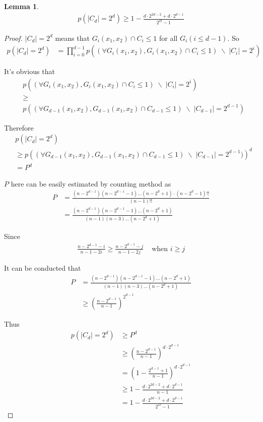 \documentclass[10pt,a4paper]{article}
\newtheorem{mylemma}{Lemma}
\begin{document}
		\begin{mylemma}
			\begin{align*}
				p(|C_d| = 2^d) \geq 1-\frac{d \cdot 2^{2d-2}+d \cdot 2^{d-1}}{2^D-1}
			\end{align*}
		\end{mylemma}
		
		\begin{proof}
			$|C_d| = 2^d$ means that $G_i(x_1, x_2) \cap C_i \leq 1$
			for all $G_i(i \leq d-1)$. So
			\begin{align*}
				p(|C_d| = 2^d) &= \prod_{i=0}^{d-1} p\left((\forall G_i(x_1, x_2), G_i(x_1, x_2) \cap C_i \leq 1)
					 \; \backslash \; |C_i| = 2^i\right)
			\end{align*}
			
			It's obvious that
			\begin{align*}
			&p\left((\forall G_i(x_1, x_2), G_i(x_1, x_2) \cap C_i \leq 1) \; \backslash \; |C_i| = 2^i\right)\\
			&\geq \\
			&p\left((\forall G_{d-1}(x_1, x_2), G_{d-1}(x_1, x_2) \cap C_{d-1} \leq 1) \; \backslash \; 
				|C_{d-1}| = 2^{d-1}\right)
			\end{align*}
			
			Therefore
			\begin{align*}
				&p(|C_d| = 2^d) \\
				&\geq p\left((\forall G_{d-1}(x_1, x_2), G_{d-1}(x_1, x_2) 
					\cap C_{d-1} \leq 1) \; \backslash \; |C_{d-1}| = 2^{d-1})\right)^d\\
				&= P^d
			\end{align*}
			
			$P$ here can be easily estimated by counting method as
			\begin{align*}
				P &= \frac{(n-2^{d-1})(n-2^{d-1}-1)\ldots(n-2^d+1)\cdot (n-2^d-1)!!}{(n-1)!!}\\
					&= \frac{(n-2^{d-1})(n-2^{d-1}-1)\ldots (n-2^d+1)}{(n-1)(n-3)\ldots(n-2^d+1)}
			\end{align*}
			
			Since
			\begin{align*}
				\frac{n-2^{d-1}-i}{n-1-2i} \geq \frac{n-2^{d-1}-j}{n-1-2j} & \text{ when } i \geq j
			\end{align*}
			
			It can be conducted that
			\begin{align*}
				P &= \frac{(n-2^{d-1})(n-2^{d-1}-1)\ldots (n-2^d+1)}{(n-1)(n-3)\ldots(n-2^d+1)}\\
					&\geq (\frac{n-2^{d-1}}{n-1})^{2^{d-1}}
			\end{align*}
			
			Thus
			\begin{align*}
			p(|C_d| = 2^d) &\geq P^d\\
				&\geq (\frac{n-2^{d-1}}{n-1})^{d \cdot 2^{d-1}}\\
				&= (1-\frac{2^{d-1}+1}{n-1})^{d \cdot 2^{d-1}}\\
				&\geq 1-\frac{d \cdot 2^{2d-2}+d \cdot 2^{d-1}}{n-1}\\
				&= 1-\frac{d \cdot 2^{2d-2}+d \cdot 2^{d-1}}{2^D-1}
			\end{align*}
		\end{proof}
		
\end{document}
